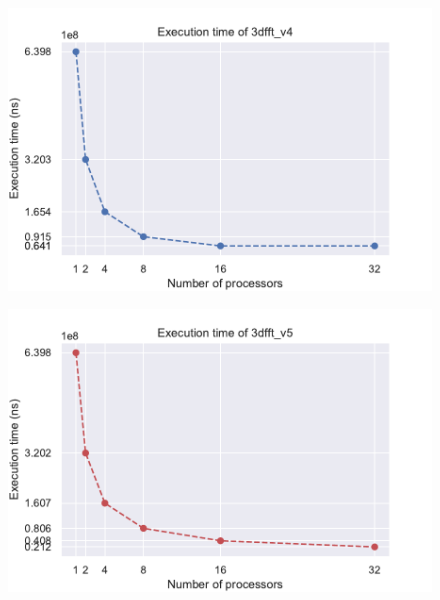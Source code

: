 \begin{figure}[H]
\centering
\begin{minipage}{.5\textwidth}
  \centering
  \includegraphics[width=\linewidth]{./data/execution_v4.pdf}
  \label{fig:exec_v4}
\end{minipage}%
\begin{minipage}{.5\textwidth}
  \centering
  \includegraphics[width=\linewidth]{./data/execution_v5.pdf}
  \label{fig:exec_v5}
\end{minipage}
\end{figure}

